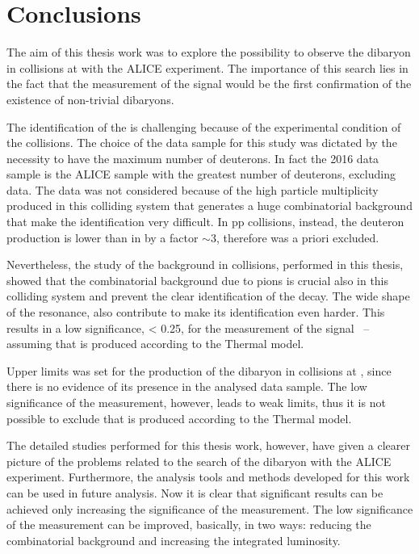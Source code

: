 %
\chapter{Conclusions} \label{sec:5}

The aim of this thesis work was to explore the possibility to observe the \dst dibaryon in \pPb collisions 
at \sctev with the ALICE experiment.
The importance of this search lies in the fact that the measurement of the \ds signal would be the first
confirmation of the existence of non-trivial dibaryons.

The identification of the \ds is challenging because of the experimental condition of the 
\pPb collisions. The choice of the \pPb data sample for this study was dictated by the necessity to have 
the maximum number of deuterons.
In fact the 2016 \pPb data sample is the ALICE sample with the greatest number of deuterons, excluding \PbPb
data. 
The \PbPb data was not considered because of the high particle multiplicity produced in this colliding
system that generates a huge combinatorial background that make the \ds identification very difficult.
In pp collisions, instead, the deuteron production is lower than in \pPb by a factor $\sim 3$, therefore
was a priori excluded.

Nevertheless, the study of the background in \pPb collisions, performed in this thesis, showed that the
combinatorial background due to pions is crucial also in this colliding system and prevent the clear 
identification of the \ds decay. 
The wide shape of the \ds resonance, also contribute to make its identification even harder.
This results in a low significance, < 0.25, for the measurement of the \ds signal \ -- assuming that
is produced according to the Thermal model.

Upper limits was set for the production of the \ds dibaryon in \pPb collisions at \sctev, since there is
no evidence of its presence in the analysed data sample. The low significance of the measurement, however, 
leads to weak limits, thus it is not possible to exclude that \ds is produced according to the Thermal
model.

The detailed studies performed for this thesis work, however, have given a clearer picture of the 
problems related to the search of the \ds dibaryon with the ALICE experiment. 
Furthermore, the analysis tools and methods developed for this work can be used in future analysis.
Now it is clear that significant results can be achieved only increasing the significance of the
measurement.
The low significance of the measurement can be improved, basically, in two ways: reducing the combinatorial
background and increasing the integrated luminosity.

